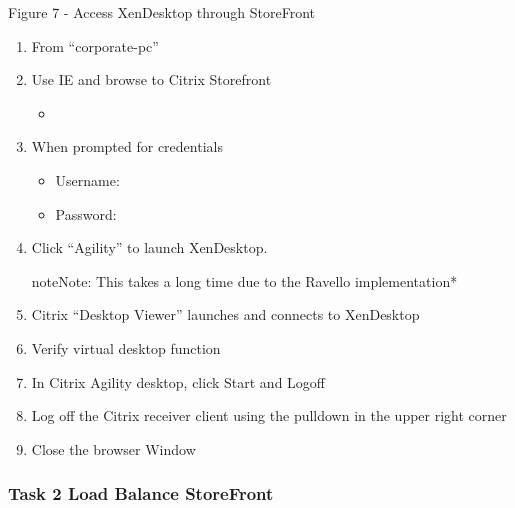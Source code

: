 \documentclass[letterpaper,10pt,english]{sphinxmanual}
\begin{document}
Figure 7 - Access XenDesktop through StoreFront
\begin{enumerate}
\item {} 
From “corporate-pc”

\item {} 
Use IE and browse to Citrix Storefront
\begin{itemize}
\item {} 

\end{itemize}

\item {} 
When prompted for credentials
\begin{itemize}
\item {} 
Username: 

\item {} 
Password: 

\end{itemize}

\item {} 
Click “Agility” to launch XenDesktop.

\begin{sphinxadmonition}{note}{Note:}
This takes a long time due to the Ravello implementation*
\end{sphinxadmonition}

\item {} 
Citrix “Desktop Viewer” launches and connects to XenDesktop

\item {} 
Verify virtual desktop function

\item {} 
In Citrix Agility desktop, click Start and Logoff

\item {} 
Log off the Citrix receiver client using the  pulldown in the
upper right corner

\item {} 
Close the browser Window

\end{enumerate}


\subsubsection{Task 2 \textendash{} Load Balance StoreFront}
\label{\detokenize{class2/module2/lab1:task-2-load-balance-storefront}}
\end{document}
